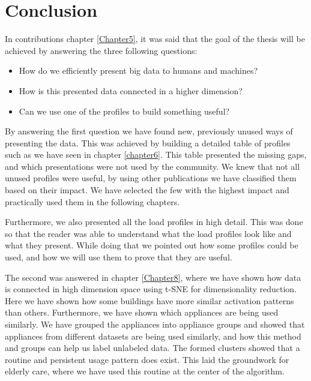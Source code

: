 \chapter{Conclusion} %

\label{Chapter9} %

In contributions chapter \ref{Chapter5}, it was said that the goal of the thesis will be achieved by answering the three following questions:

\begin{itemize}
	\item How do we efficiently present big data to humans and machines?
	\item How is this presented data connected in a higher dimension?
	\item Can we use one of the profiles to build something useful? 
\end{itemize}

By answering the first question we have found new, previously unused ways of presenting the data.
This was achieved by building a detailed table of profiles such as we have seen in chapter \ref{chapter6}.
This table presented the missing gaps, and which presentations were not used by the community.
We knew that not all unused profiles were useful, by using other publications we have classified them based on their impact. 
We have selected the few with the highest impact and practically used them in the following chapters.

Furthermore, we also presented all the load profiles in high detail. This was done so that the reader was able to understand what the load profiles look like and what they present.
While doing that we pointed out how some profiles could be used, and how we will use them to prove that they are useful. 

The second was answered in chapter \ref{Chapter8}, where we have shown how data is connected in high dimension space
using t-SNE for dimensionality reduction. Here we have shown how some buildings have more similar activation patterns than others.
Furthermore, we have shown which appliances are being used similarly. 
We have grouped the appliances into appliance groups and showed that appliances from different datasets are being used similarly, and how this method and groups can help us label unlabeled data. 
The formed clusters showed that a routine and persistent usage pattern does exist. This laid the groundwork for elderly care, where we have used this routine at the center of the algorithm.

